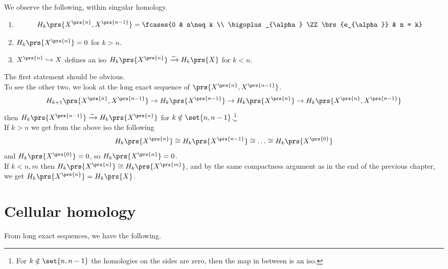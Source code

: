 \documentclass[10pt,a4paper,twoside,openany,hidelinks]{book}
\newcommand{\ra}{\rightarrow}
\begin{document}
We observe the following, within singular homology.

\begin{proposition} \label{cellular homology: properties of singular homlogy}
\begin{enumerate}
\item  \[H_k\prs{X^{\prs{n}}, X^{\prs{n-1}}} = \fcases{0 & n\neq k \\ \bigoplus_{\alpha} \ZZ\brs{e_{\alpha}} & n = k}\]

\item $H_k\prs{X^{\prs{n}}} = 0$ for $k > n$.

\item $X^{\prs{n}} \hookrightarrow X$ defines an iso $H_k\prs{X^{\prs{n}}} \xrightarrow{\sim} H_k\prs{X}$ for $k<n$.

\end{enumerate}
\end{proposition}

The first statement should be obvious.\\
To see the other two, we look at the long exact sequence of $\prs{X^{\prs{n}}, X^{\prs{n-1}}}$.
\[H_{k+1}\prs{X^{\prs{n}}, X^{\prs{n-1}}} \ra H_{k} \prs{X^{\prs{n-1}}} \ra H_{k} \prs{X^{\prs{n}}} \ra H_{k}\prs{X^{\prs{n}}, X^{\prs{n-1}}}\]
then
$H_{k}\prs{X^{\prs{n-1}}} \xrightarrow{\sim} H_{k} \prs{X^{\prs{n}}}$ for $k \notin \set{n,n-1}$.\footnote{For $k \notin \set{n,n-1}$ the homologies on the sides are zero, then the map in between is an iso.}\\
If $k>n$ we get from the above iso the following
\[H_k\prs{X^{\prs{n}}} \cong H_k\prs{X^{\prs{n-1}}} \cong \ldots \cong H_k\prs{X^{\prs{0}}}\] and
$H_k\prs{X^{\prs{0}}} = 0$, so $H_k\prs{X^{\prs{n}}} = 0$.\\
If $k < n,m$ then $H_k\prs{X^{\prs{n}}} \cong H_k\prs{X^{\prs{m}}}$, and by the same compactness argument as in the end of the previous chapter, we get $H_k\prs{X^{\prs{n}}} = H_k\prs{X}$.

\section{Cellular homology}

From long exact sequences, we have the following.

\end{document}
